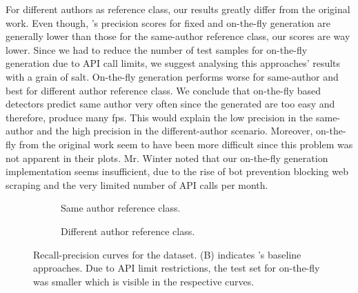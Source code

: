 For different authors as reference class, our results greatly differ from the original work.
Even though, \citet{koppel_determining_2014}'s precision scores for fixed and on-the-fly \imp{} generation are generally lower than those for the same-author reference class, our scores are way lower.
Since we had to reduce the number of test samples for on-the-fly \imp{} generation due to API call limits, we suggest analysing this approaches' results with a grain of salt.
On-the-fly \imp{} generation performs worse for same-author and best for different author reference class.
We conclude that on-the-fly based detectors predict same author very often since the generated \imps{} are too easy and therefore, produce many \acp{fp}.
This would explain the low precision in the same-author and the high precision in the different-author scenario.
Moreover, on-the-fly \imps{} from the original work seem to have been more difficult since this problem was not apparent in their plots.
Mr. Winter noted that our on-the-fly \imp{} generation implementation seems insufficient, due to the rise of bot prevention blocking web scraping and the very limited number of API calls per month.




\begin{figure}[htbp]
  \centering
  \begin{subfigure}[b]{0.595\textwidth}
    \centering
    
    \caption{Same author reference class. }
    \label{fig:blog_same_author}
  \end{subfigure}
  \hfill
  \begin{subfigure}[b]{0.595\textwidth}
    \centering
    
    \caption{Different author reference class.}
    \label{fig:blog_diff_author}
  \end{subfigure}
  \caption{Recall-precision curves for the \dataBlog{} dataset. 
  (B) indicates \citet{koppel_determining_2014}'s baseline approaches.
  Due to API limit restrictions, the test set for on-the-fly was smaller which is visible in the respective curves.}
  \label{fig:diff_imp_gen_blog}
\end{figure}

